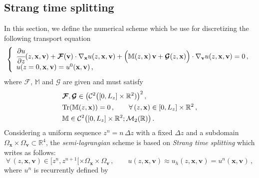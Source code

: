 \documentclass[10pt]{article}
\newcommand{\R}{{\mathbb R}}
\newcommand{\D}{{\partial}}
\newcommand{\Cl}{{\mathcal C}}
\begin{document}
\subsection{Strang time splitting}
In this section, we define the numerical scheme which be use for discretizing the following transport equation
\begin{equation} \label{transport_SL}
\left\{
\begin{array}{l}
\cfrac{\D u}{\D z}(z,\mathbf{x},\mathbf{v}) + \bm{\mathcal{F}}(\mathbf{v}) \cdot \nabla_{\mathbf{x}}u(z,\mathbf{x},\mathbf{v}) + \Big( \mathbb{M}(z,\mathbf{x})\,\mathbf{v} + \bm{\mathcal{G}}(z,\mathbf{x})\Big) \cdot \nabla_{\mathbf{v}}u(z,\mathbf{x},\mathbf{v}) = 0 \, , \\
u(z=0,\mathbf{x},\mathbf{v}) = u^{0}(\mathbf{x},\mathbf{v}) \, ,
\end{array}
\right.
\end{equation}
where $\bm{\mathcal{F}}$, $\mathbb{M}$ and $\bm{\mathcal{G}}$ are given and must satisfy
\begin{equation}
\begin{split}
& \bm{\mathcal{F}}, \bm{\mathcal{G}} \in \big(\Cl^{2}\big([0,L_{z}] \times \R^{2})\big)^{2} \, , \\
& \textnormal{Tr}(\mathbb{M}(z,\mathbf{x})) = 0 \, , \qquad \forall\,(z,\mathbf{x}) \in [0,L_{z}] \times \R^{2} \, ,\\
& \mathbb{M} \in \Cl^{2}\big([0,L_{z}] \times \R^{2}; \mathcal{M}_{2}(\R)\big) \, .
\end{split}
\end{equation}
Considering a uniform sequence $z^{n} = n\,\Delta z$ with a fixed $\Delta z$ and a subdomain $\Omega_{\mathbf{x}} \times \Omega_{\mathbf{v}} \subset \R^{4}$, the \textit{semi-lagrangian} scheme is based on \textit{Strang time splitting} which writes as follows:
\begin{equation}
\forall\, (z,\mathbf{x},\mathbf{v}) \in [z^{n},z^{n+1}[ \times \Omega_{\mathbf{x}} \times \Omega_{\mathbf{v}} \, , \qquad u(z,\mathbf{x},\mathbf{v}) \approx u_{h}(z,\mathbf{x},\mathbf{v}) = u^{n}(\mathbf{x},\mathbf{v}) \, , 
\end{equation}
where $u^{n}$ is recurrently defined by
\end{document}
